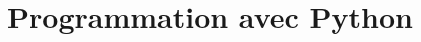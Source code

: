 \documentclass[10pt,a4paper,cours,firamath]{nsi}
\begin{document}

%
% 
% 
% 

 \part{Programmation avec Python}












% 
% 
% 
% 


% 
% 
% 
% 


% 
% 
% 


% 
\end{document}
